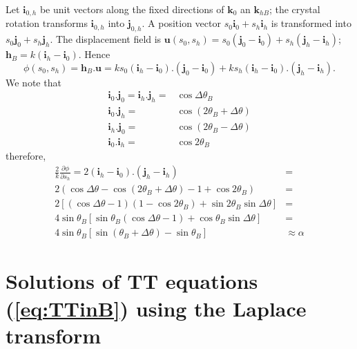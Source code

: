 \documentclass{iucr}
\begin{document}
Let $\textbf{i}_{0,h}$ be unit vectors along the fixed directions of $\textbf{k}_0$ an $\textbf{k}_{hB}$; the crystal rotation transforms $\textbf{i}_{0,h}$ into $\textbf{j}_{0,h}$. A position vector $s_0\textbf{i}_0+s_h\textbf{i}_h$ is transformed into $s_0\textbf{j}_0+s_h\textbf{j}_h$. The displacement field is $\textbf{u}(s_0,s_h)=s_0(\textbf{j}_0-\textbf{i}_0)+ s_h(\textbf{j}_h-\textbf{i}_h)$; $\textbf{h}_B=k(\textbf{i}_h-\textbf{i}_0)$. Hence
\begin{equation}
    \phi(s_0,s_h)=\textbf{h}_B.\textbf{u}=k s_0(\textbf{i}_h-\textbf{i}_0).(\textbf{j}_0-\textbf{i}_0) + 
    k s_h(\textbf{i}_h-\textbf{i}_0).(\textbf{j}_h-\textbf{i}_h). \nonumber
\end{equation}
We note that 
\begin{subequations}
\begin{align}
    \textbf{i}_0.\textbf{j}_0=\textbf{i}_h.\textbf{j}_h=&\cos\Delta\theta_B \nonumber \\
    \textbf{i}_0.\textbf{j}_h=&\cos(2\theta_B +\Delta\theta) \nonumber \\
    \textbf{i}_h.\textbf{j}_0=&\cos(2\theta_B -\Delta\theta) \nonumber \\
    \textbf{i}_0.\textbf{i}_h=&\cos2\theta_B \nonumber
\end{align}
\end{subequations}
therefore, 
\begin{subequations}
\begin{align}
    \frac{2}{k}\frac{\partial\phi}{\partial s_h} =  2(\textbf{i}_h-\textbf{i}_0).(\textbf{j}_h-\textbf{i}_h)&= \nonumber\\
    2(\cos\Delta\theta - \cos(2\theta_B+\Delta\theta)-1+\cos2\theta_B)&= \nonumber\\
    2[(\cos\Delta\theta-1)(1-\cos2\theta_B)+\sin2\theta_B\sin\Delta\theta]&=\nonumber\\
    4 \sin\theta_B[\sin\theta_B(\cos\Delta\theta-1)+\cos\theta_B\sin\Delta\theta]&=\nonumber\\
    4 \sin\theta_B[\sin(\theta_B+\Delta\theta)-\sin\theta_B]&\approx
    \alpha \nonumber
\end{align}
\end{subequations}



\section{Solutions of TT equations (\ref{eq:TTinB}) using the Laplace transform}
\label{appendix:laplace}
\end{document}
